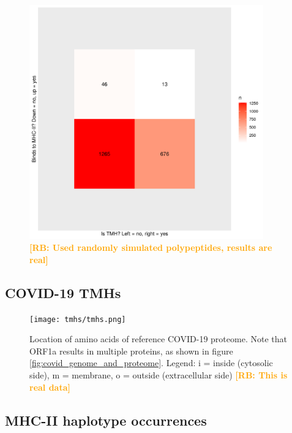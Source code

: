 \documentclass{article}
\newcommand{\richel}[1]{\textcolor{orange}{\textbf{[RB: #1]}}}
\begin{document}
\begin{figure}[!htbp]
  \includegraphics[width=0.9\textwidth]{p_bind_per_hydrophobicity/is_tmh_vs_binds_mhc2.png}
  \caption{
    \richel{Used randomly simulated polypeptides, results are real}
  }
  \label{fig:is_tmh_vs_binds_mhc2}
\end{figure}


\subsection{COVID-19 TMHs}

\begin{figure}[!htbp]
  \texttt{[image: tmhs/tmhs.png]}
  \caption{
    Location of amino acids of reference COVID-19 proteome.
    Note that ORF1a results in multiple proteins, 
    as shown in figure \ref{fig:covid_genome_and_proteome}.
    Legend: i = inside (cytosolic side), m = membrane, o = outside (extracellular side)
    \richel{This is real data}
  }
  \label{fig:covid_locatome}
\end{figure}


\subsection{MHC-II haplotype occurrences}
\end{document}
